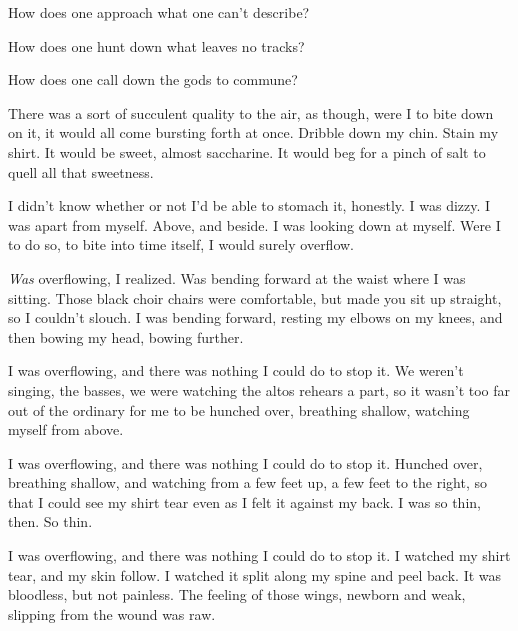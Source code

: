 
\begin{paracol}{2}
\begin{leftcolumn}
\null
\vfill
{}
\vfill
\newpage

\noindent How does one approach what one can't describe?


\noindent How does one hunt down what leaves no tracks?


\noindent How does one call down the gods to commune?

\newpage

\null
\vspace{1cm}
\noindent There was a sort of succulent quality to the air, as though, were I to bite down on it, it would all come bursting forth at once. Dribble down my chin. Stain my shirt. It would be sweet, almost saccharine. It would beg for a pinch of salt to quell all that sweetness.

I didn't know whether or not I'd be able to stomach it, honestly. I was dizzy. I was apart from myself. Above, and beside. I was looking down at myself. Were I to do so, to bite into time itself, I would surely overflow.

\emph{Was} overflowing, I realized. Was bending forward at the waist where I was sitting. Those black choir chairs were comfortable, but made you sit up straight, so I couldn't slouch. I was bending forward, resting my elbows on my knees, and then bowing my head, bowing further.

I was overflowing, and there was nothing I could do to stop it. We weren't singing, the basses, we were watching the altos rehears a part, so it wasn't too far out of the ordinary for me to be hunched over, breathing shallow, watching myself from above.

I was overflowing, and there was nothing I could do to stop it. Hunched over, breathing shallow, and watching from a few feet up, a few feet to the right, so that I could see my shirt tear even as I felt it against my back. I was so thin, then. So thin.

I was overflowing, and there was nothing I could do to stop it. I watched my shirt tear, and my skin follow. I watched it split along my spine and peel back. It was bloodless, but not painless. The feeling of those wings, newborn and weak, slipping from the wound was raw.


\end{leftcolumn}
\end{paracol}
